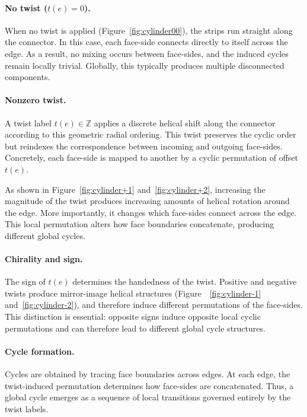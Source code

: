 \documentclass[acmtog]{acmart}
\begin{document}
\paragraph{No twist ($t(e)=0$).}
When no twist is applied (Figure~\ref{fig:cylinder00}), the strips run straight along the connector. In this case, each face-side connects directly to itself across the edge. As a result, no mixing occurs between face-sides, and the induced cycles remain locally trivial. Globally, this typically produces multiple disconnected components.

\paragraph{Nonzero twist.}
A twist label $t(e)\in\mathbb{Z}$ applies a discrete helical shift along the connector according to this geometric radial ordering. This twist preserves the cyclic order but reindexes the correspondence between incoming and outgoing face-sides.
Concretely, each face-side is mapped to another by a cyclic permutation of offset $t(e)$.

As shown in Figure~\ref{fig:cylinder+1} and~\ref{fig:cylinder+2}, increasing the magnitude of the twist produces increasing amounts
of helical rotation around the edge. More importantly, it changes which face-sides connect across the edge. This local permutation alters how face boundaries concatenate, producing different global cycles.

\paragraph{Chirality and sign.}
The sign of $t(e)$ determines the handedness of the twist. Positive and negative twists produce mirror-image helical structures (Figure~~\ref{fig:cylinder-1} and~\ref{fig:cylinder-2}), and therefore induce different permutations of the face-sides. This distinction is essential: opposite signs induce opposite local cyclic permutations and can therefore lead to different global cycle structures.

\paragraph{Cycle formation.}
Cycles are obtained by tracing face boundaries across edges. At each edge, the twist-induced permutation determines how face-sides are concatenated. Thus, a global cycle emerges as a sequence of local transitions governed entirely by the twist labels.
\end{document}
